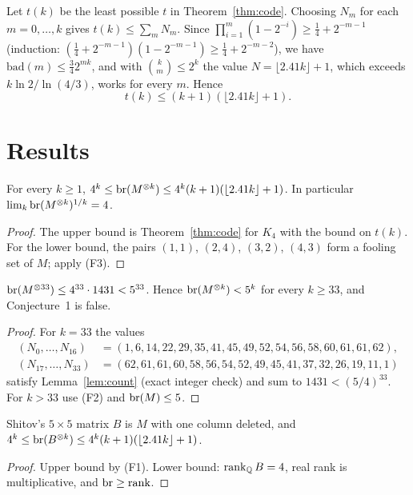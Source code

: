 Let $t(k)$ be the least possible $t$ in Theorem~\ref{thm:code}. Choosing $N_m$ for each $m=0,\dots,k$ gives $t(k)\le\sum_m N_m$. Since $\prod_{i=1}^m(1-2^{-i})\ge\frac14+2^{-m-1}$ (induction: $(\frac14+2^{-m-1})(1-2^{-m-1})\ge\frac14+2^{-m-2}$), we have $\mathrm{bad}(m)\le\frac34 2^{mk}$, and with $\binom km\le 2^k$ the value $N=\lfloor2.41k\rfloor+1$, which exceeds $k\ln 2/\ln(4/3)$, works for every $m$. Hence
\[
t(k)\le(k+1)(\lfloor 2.41k\rfloor+1).
\]

\section{Results}

\begin{theorem}\label{thm:main}
For every $k\ge1$, $4^k\le\operatorname{br}(M^{\otimes k})\le4^k(k+1)(\lfloor2.41k\rfloor+1)$. In particular $\lim_k\operatorname{br}(M^{\otimes k})^{1/k}=4$.
\end{theorem}
\begin{proof}
The upper bound is Theorem~\ref{thm:code} for $K_4$ with the bound on $t(k)$. For the lower bound, the pairs $(1,1)$, $(2,4)$, $(3,2)$, $(4,3)$ form a fooling set of $M$; apply (F3).
\end{proof}

\begin{corollary}\label{cor:33}
$\operatorname{br}(M^{\otimes33})\le4^{33}\cdot1431<5^{33}$. Hence $\operatorname{br}(M^{\otimes k})<5^k$ for every $k\ge33$, and Conjecture~1 is false.
\end{corollary}
\begin{proof}
For $k=33$ the values
\[
\begin{aligned}(N_0,\dots,N_{16})&=(1,6,14,22,29,35,41,45,49,52,54,56,58,60,61,61,62),\\ (N_{17},\dots,N_{33})&=(62,61,61,60,58,56,54,52,49,45,41,37,32,26,19,11,1)\end{aligned}
\]
satisfy Lemma~\ref{lem:count} (exact integer check) and sum to $1431<(5/4)^{33}$. For $k>33$ use (F2) and $\operatorname{br}(M)\le5$.
\end{proof}

\begin{corollary}\label{cor:shitov}
Shitov's $5\times5$ matrix $B$ \cite{Sh26} is $M$ with one column deleted, and $4^k\le\operatorname{br}(B^{\otimes k})\le4^k(k+1)(\lfloor2.41k\rfloor+1)$.
\end{corollary}
\begin{proof}
Upper bound by (F1). Lower bound: $\operatorname{rank}_{\mathbb Q}B=4$, real rank is multiplicative, and $\operatorname{br}\ge\operatorname{rank}$.
\end{proof}

